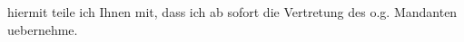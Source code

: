 \documentclass[11pt,ngerman,latin9]{g-brief2}
\begin{document}
\begin{g-brief}

hiermit teile ich Ihnen mit, dass ich ab sofort die Vertretung 
des o.g. Mandanten uebernehme.

\end{g-brief}
\end{document}
